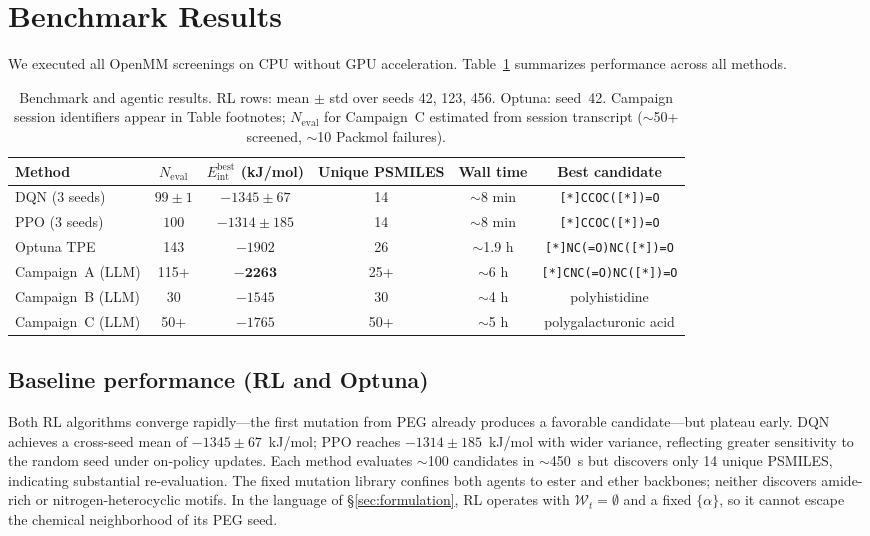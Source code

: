 \documentclass[twocolumn]{fairmeta}
\begin{document}
\section{Benchmark Results}
\label{sec:results}

We executed all OpenMM screenings on CPU without GPU acceleration.
Table~\ref{tab:benchmarks} summarizes performance across all methods.

\begin{table}[t]
\centering
\caption{Benchmark and agentic results. RL rows: mean $\pm$ std over seeds 42, 123, 456. Optuna: seed~42. Campaign session identifiers appear in Table footnotes; $N_\text{eval}$ for Campaign~C estimated from session transcript (${\sim}$50+ screened, ${\sim}$10 Packmol failures).}
\label{tab:benchmarks}
\small
\begin{tabular}{lccccc}
\toprule
\textbf{Method} & \textbf{$N_\text{eval}$} & \textbf{$E_\text{int}^\text{best}$ (kJ/mol)} & \textbf{Unique PSMILES} & \textbf{Wall time} & \textbf{Best candidate} \\
\midrule
DQN (3 seeds)   & $99 \pm 1$  & $-1345 \pm 67$   & 14 & ${\sim}$8 min  & \texttt{[*]CCOC([*])=O} \\
PPO (3 seeds)   & $100$       & $-1314 \pm 185$  & 14 & ${\sim}$8 min  & \texttt{[*]CCOC([*])=O} \\
Optuna TPE      & 143         & $-1902$          & 26 & ${\sim}$1.9 h  & \texttt{[*]NC(=O)NC([*])=O} \\
Campaign~A (LLM)   & 115+        & $\mathbf{-2263}$ & 25+ & ${\sim}$6 h  & \texttt{[*]CNC(=O)NC([*])=O} \\
Campaign~B (LLM)   & 30          & $-1545$          & 30 & ${\sim}$4 h  & polyhistidine \\
Campaign~C (LLM)   & 50+         & $-1765$          & 50+ & ${\sim}$5 h  & polygalacturonic acid \\
\bottomrule
\end{tabular}
\end{table}

\subsection{Baseline performance (RL and Optuna)}

Both RL algorithms converge rapidly---the first mutation from PEG already produces a favorable candidate---but plateau early.
DQN achieves a cross-seed mean of $-1345 \pm 67$~kJ/mol; PPO reaches $-1314 \pm 185$~kJ/mol with wider variance, reflecting greater sensitivity to the random seed under on-policy updates.
Each method evaluates ${\sim}$100 candidates in ${\sim}$450~s but discovers only 14 unique PSMILES, indicating substantial re-evaluation.
The fixed mutation library confines both agents to ester and ether backbones; neither discovers amide-rich or nitrogen-heterocyclic motifs.
In the language of \S\ref{sec:formulation}, RL operates with $\mathcal{W}_t = \emptyset$ and a fixed $\{\alpha\}$, so it cannot escape the chemical neighborhood of its PEG seed.
\end{document}
